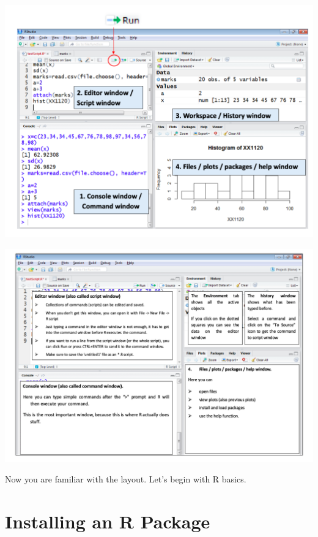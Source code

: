 \documentclass[
]{book}
\begin{document}
\begin{center}\includegraphics[width=1\linewidth]{figure/Rstudio1} \end{center}

\begin{center}\includegraphics[width=1\linewidth]{figure/Rstudio2} \end{center}

Now you are familiar with the layout. Let's begin with R basics.

\hypertarget{installing-an-r-package}{%
\section{Installing an R Package}\label{installing-an-r-package}}
\end{document}

